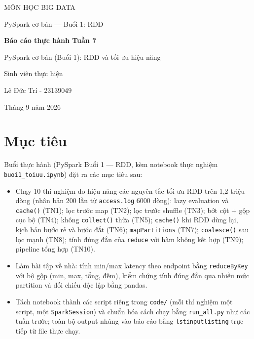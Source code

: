 \documentclass[12pt,a4paper,oneside]{article}
\begin{document}
\begin{titlepage}
\centering
{\large MÔN HỌC BIG DATA\par}
\vspace{0.4cm}
{\large PySpark cơ bản --- Buổi 1: RDD\par}
\vspace{3cm}
{\LARGE\bfseries Báo cáo thực hành Tuần 7\par}
\vspace{0.6cm}
{\Large PySpark cơ bản (Buổi 1): RDD và tối ưu hiệu năng\par}
\vspace{3cm}
{\large Sinh viên thực hiện\par}
{\large Lê Đức Trí - 23139049 \par}
\vfill
{\large Tháng 9 năm 2026\par}
\end{titlepage}

\tableofcontents
\newpage

\section{Mục tiêu}
\label{sec:muctieu}

Buổi thực hành (PySpark Buổi 1 --- RDD, kèm notebook thực nghiệm \texttt{buoi1\_toiuu.ipynb}) đặt ra các mục tiêu sau:

\begin{itemize}
  \item Chạy 10 thí nghiệm đo hiệu năng các nguyên tắc tối ưu RDD trên 1,2 triệu dòng (nhân bản 200 lần từ \texttt{access.log} 6000 dòng): lazy evaluation và \texttt{cache()} (TN1); lọc trước map (TN2); lọc trước shuffle (TN3); bớt cột + gộp cục bộ (TN4); không \texttt{collect()} thừa (TN5); \texttt{cache()} khi RDD dùng lại, kịch bản bước rẻ và bước đắt (TN6); \texttt{mapPartitions} (TN7); \texttt{coalesce()} sau lọc mạnh (TN8); tính đúng đắn của \texttt{reduce} với hàm không kết hợp (TN9); pipeline tổng hợp (TN10).
  \item Làm bài tập về nhà: tính min/max latency theo endpoint bằng \texttt{reduceByKey} với bộ gộp (min, max, tổng, đếm), kiểm chứng tính đúng đắn qua nhiều mức partition và đối chiếu độc lập bằng pandas.
  \item Tách notebook thành các script riêng trong \texttt{code/} (mỗi thí nghiệm một script, một \texttt{SparkSession}) và chuẩn hóa cách chạy bằng \texttt{run\_all.py} như các tuần trước; toàn bộ output nhúng vào báo cáo bằng \texttt{lstinputlisting} trực tiếp từ file thực chạy.
\end{itemize}
\end{document}
